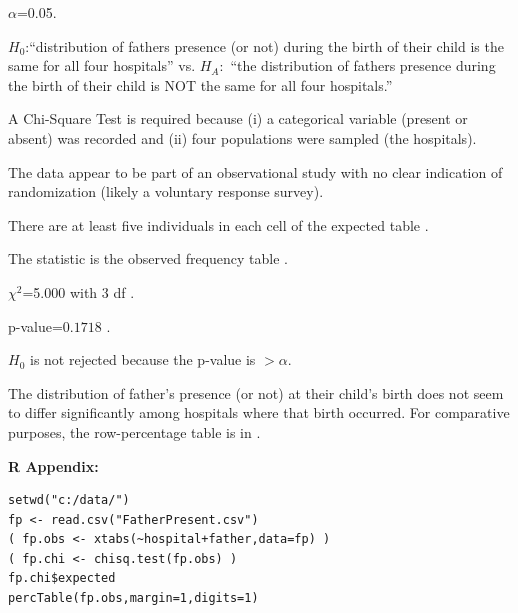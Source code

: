 \documentclass[10pt,openany]{book}\usepackage[]{graphicx}\usepackage[]{color}
\makeatletter
\newenvironment{kframe}{%
 \def\at@end@of@kframe{}%
 \ifinner\ifhmode%
  \def\at@end@of@kframe{\end{minipage}}%
  \begin{minipage}{\columnwidth}%
 \fi\fi%
 \def\FrameCommand##1{\hskip\@totalleftmargin \hskip-\fboxsep
 \colorbox{shadecolor}{##1}\hskip-\fboxsep
     \hskip-\linewidth \hskip-\@totalleftmargin \hskip\columnwidth}%
 \MakeFramed {\advance\hsize-\width
   \@totalleftmargin\z@ \linewidth\hsize
   \@setminipage}}%
 {\par\unskip\endMakeFramed%
 \at@end@of@kframe}
\newenvironment{knitrout}{}{} %
\makeatother
\begin{document}
\vspace{-6pt}
\begin{Enumerate}
  \item $\alpha$=0.05.
  \item $H_{0}$:``distribution of fathers presence (or not) during the birth of their child is the same for all four hospitals'' vs. $H_{A}:$ ``the distribution of fathers presence during the birth of their child is NOT the same for all four hospitals.''
  \item A Chi-Square Test is required because (i) a categorical variable (present or absent) was recorded and (ii) four populations were sampled (the hospitals).
  \item The data appear to be part of an observational study with no clear indication of randomization (likely a voluntary response survey).
  \item There are at least five individuals in each cell of the expected table .
  \item The statistic is the observed frequency table .
  \item $\chi^{2}$=5.000 with 3 df .
  \item p-value=$0.1718$ .
  \item $H_{0}$ is not rejected because the p-value is $>\alpha$.
  \item The distribution of father's presence (or not) at their child's birth does not seem to differ significantly among hospitals where that birth occurred. For comparative purposes, the row-percentage table is in .
\end{Enumerate}

\begin{minipage}{\textwidth}
\textbf{R Appendix:}
\vspace{-4pt}
\begin{knitrout}
\color{fgcolor}\begin{kframe}
\begin{verbatim}
setwd("c:/data/")
fp <- read.csv("FatherPresent.csv")
( fp.obs <- xtabs(~hospital+father,data=fp) )
( fp.chi <- chisq.test(fp.obs) )
fp.chi$expected
percTable(fp.obs,margin=1,digits=1)
\end{verbatim}
\end{kframe}
\end{knitrout}
\end{minipage}
\end{document}
